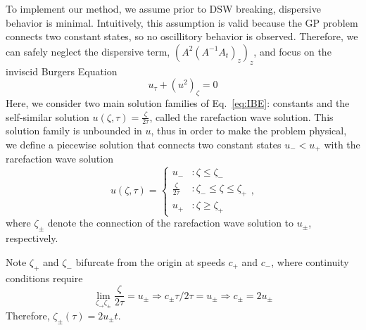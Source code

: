 \documentclass{jfm}
\begin{document}
To implement our method, we assume prior to DSW breaking, dispersive behavior is minimal. 
Intuitively, this assumption is valid because the GP problem connects two constant states, so no oscillitory behavior is observed.
Therefore, we can safely neglect the dispersive term, $(A^2(A^{-1}A_t)_z)_z$, and focus on the inviscid Burgers Equation
\begin{equation}\label{eq:IBE}
	u_\tau + \left(u^2\right)_\zeta = 0  
\end{equation}
Here, we consider two main solution families of Eq.~\ref{eq:IBE}: constants and the self-similar solution $u(\zeta,\tau) =  \frac{\zeta}{2\tau}$, called the rarefaction wave solution. 
This solution family is unbounded in $u$, thus in order to make the problem physical, we define a piecewise solution that connects two constant states $u_-<u_+$ with the rarefaction wave solution
\begin{equation}\label{eq:raresoln}
   u(\zeta,\tau) = \begin{cases}
               u_- & : \zeta\le \zeta_-\\
               \frac{\zeta}{2\tau} & : \zeta_- \le \zeta \le \zeta_+\\
               u_+ & :\zeta\ge \zeta_+
            \end{cases},
\end{equation}  
where $\zeta_\pm$ denote the connection of the rarefaction wave solution to $u_\pm$, respectively. %


 Note $\zeta_+$ and $\zeta_-$ bifurcate from the origin at speeds $c_+$ and $c_-$, where continuity conditions require
\begin{equation}
   \lim_{\zeta_\to \zeta_\pm} \frac{\zeta}{2\tau} = u_\pm 
   \Rightarrow  c_\pm \tau/2\tau=u_\pm 
   \Rightarrow c_\pm=2u_\pm
\end{equation}
Therefore, $\zeta_\pm(\tau) = 2u_\pm t$.
\end{document}
